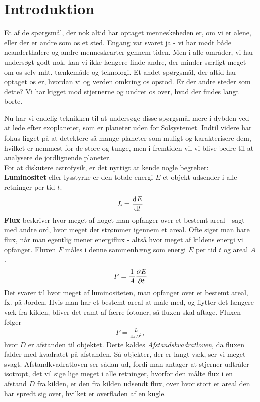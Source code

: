 \section{Introduktion} \label{exointro}
Et af de spørgsmål, der nok altid har optaget menneskeheden er, om vi er alene, eller der er andre som os et sted. Engang var svaret ja - vi har mødt både neanderthalere og andre menneskearter gennem tiden. Men i alle områder, vi har undersøgt godt nok, kan vi ikke længere finde andre, der minder særligt meget om os selv mht. tænkemåde og teknologi. Et andet spørgsmål, der altid har optaget os er, hvordan vi og verden omkring os opstod. Er der andre steder som dette? Vi har kigget mod stjernerne og undret os over, hvad der findes langt borte.

Nu har vi endelig teknikken til at undersøge disse spørgsmål mere i dybden ved at lede efter exoplaneter, som er planeter uden for Solsystemet. Indtil videre har fokus ligget på at detektere så mange planeter som muligt og karakterisere dem, hvilket er nemmest for de store og tunge, men i fremtiden vil vi blive bedre til at analysere de jordlignende planeter. \\

\noindent
For at diskutere astrofysik, er det nyttigt at kende nogle begreber:\\

\noindent
\textbf{Luminositet} eller lysstyrke er den totale energi $E$ et objekt udsender i alle retninger per tid $t$.
\begin{align}
    L=\dif{t}{E}
\end{align}
\noindent
\textbf{Flux} beskriver hvor meget af noget man opfanger over et bestemt areal - sagt med andre ord, hvor meget der strømmer igennem et areal. Ofte siger man bare flux, når man egentlig mener energiflux - altså hvor meget af kildens energi vi opfanger. Fluxen $F$ måles i denne sammenhæng som energi $E$ per tid $t$ og areal $A$.
\begin{align}
    F=\frac{1}{A}\pdif{t}{E}
\end{align}
Det svarer til hvor meget af luminositeten, man opfanger over et bestemt areal, fx. på Jorden. Hvis man har et bestemt areal at måle med, og flytter det længere væk fra kilden, bliver det ramt af færre fotoner, så fluxen skal aftage. Fluxen følger
\begin{align}
    F=\frac{L}{4\pi D^2}, \label{afstandskv}
\end{align}
hvor $D$ er afstanden til objektet. Dette kaldes \emph{Afstandskvadratloven}, da fluxen falder med kvadratet på afstanden. Så objekter, der er langt væk, ser vi meget svagt. Afstandkvadratloven ser sådan ud, fordi man antager at stjerner udtråler isotropt, det vil sige lige meget i alle retninger, hvorfor den målte flux i en afstand $D$ fra kilden, er den fra kilden udsendt flux, over hvor stort et areal den har spredt sig over, hvilket er overfladen af en kugle.

